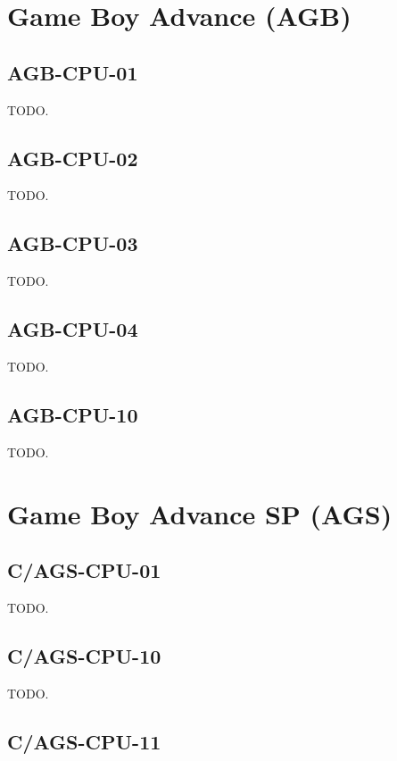 \section{Game Boy Advance (AGB)}

\subsection{AGB-CPU-01}

TODO.

\subsection{AGB-CPU-02}

TODO.

\subsection{AGB-CPU-03}

TODO.

\subsection{AGB-CPU-04}

TODO.

\subsection{AGB-CPU-10}

TODO.

\section{Game Boy Advance SP (AGS)}

\subsection{C/AGS-CPU-01}

TODO.

\subsection{C/AGS-CPU-10}

TODO.

\subsection{C/AGS-CPU-11}

